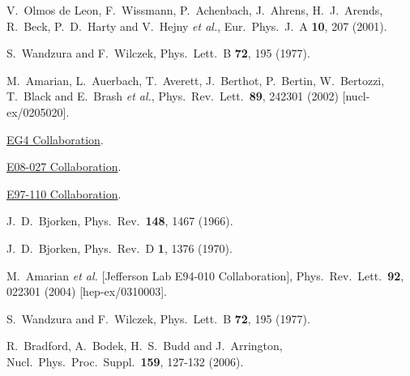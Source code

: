 \documentclass[twocolumn,prc,showpacs,nofootinbib,preprintnumbers,amsmath,amssymb,superscriptaddress]{revtex4-1}
\begin{document}
\begin{thebibliography}{99}
V.~Olmos de Leon, F.~Wissmann, P.~Achenbach, J.~Ahrens, H.~J.~Arends, R.~Beck, P.~D.~Harty and V.~Hejny {\it et al.}, 
Eur.\ Phys.\ J.\ A {\bf 10}, 207 (2001). 


  S.~Wandzura and F.~Wilczek,
  Phys.\ Lett.\ B {\bf 72}, 195 (1977).
  
  M.~Amarian, L.~Auerbach, T.~Averett, J.~Berthot, P.~Bertin, W.~Bertozzi, T.~Black and E.~Brash {\it et al.},
  Phys.\ Rev.\ Lett.\  {\bf 89}, 242301 (2002)
  [nucl-ex/0205020].
  
\href{http://clasweb.jlab.org/gdh_lowq2/}{EG4 Collaboration}. 

\href{http://hallaweb.jlab.org/experiment/E08-027/}{E08-027 Collaboration}.  

\href{http://hallaweb.jlab.org/experiment/E97-110/}{E97-110 Collaboration}.  


  J.~D.~Bjorken,
  Phys.\ Rev.\  {\bf 148}, 1467 (1966).
  
  J.~D.~Bjorken,
  Phys.\ Rev.\ D {\bf 1}, 1376 (1970).
  
  M.~Amarian {\it et al.}  [Jefferson Lab E94-010 Collaboration],
  Phys.\ Rev.\ Lett.\  {\bf 92}, 022301 (2004)
  [hep-ex/0310003].

  S.~Wandzura and F.~Wilczek,
  Phys.\ Lett.\ B {\bf 72}, 195 (1977).

R.~Bradford, A.~Bodek, H.~S.~Budd and J.~Arrington, Nucl.\ Phys.\ Proc.\ Suppl.\ {\bf 159}, 127-132 (2006).




\end{thebibliography}
\end{document}
